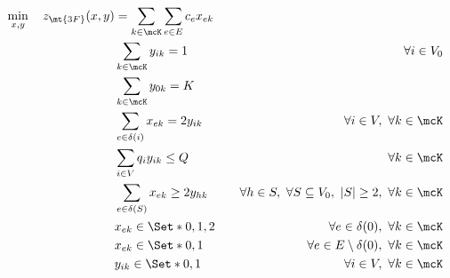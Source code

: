 \begin{align}
	\min_{x, y} \quad z_\mt{3F}(x, y) & = \sum_{k \in \mcK} \sum_{e \in E} c_{e} x_{ek} \label{eq:three-index-flow-obj-func}                                                                                                                           \\
	                                  & \sum_{k \in \mcK} y_{ik} = 1                                                         & \quad \forall i \in V_0                                              \label{eq:three-index-flow-all-customers-visited}  \\
	                                  & \sum_{k \in \mcK} y_{0k} = K                                                         & \label{eq:three-index-flow-tour-starts-and-ends-at-depot}                                                               \\
	                                  & \sum_{e \in \delta(i)} x_{ek} = 2 y_{ik}                                             & \quad \forall i \in V,\ \forall k \in \mcK \label{eq:three-index-flow-force-visited-customer-if-flow}                   \\
	                                  & \sum_{i \in V} q_i y_{ik} \le Q                                                      & \quad \forall k \in \mcK \label{eq:three-index-flow-force-resource-upper-bound}                                         \\
	                                  & \sum_{e \in \delta(S)} x_{ek} \ge 2 y_{hk}                                           & \quad \forall h \in S,\ \forall S \subseteq V_0,\ |S| \ge 2,\ \forall k \in \mcK \label{eq:three-index-flow-secv1}      \\
	                                  & x_{ek}                   \in \Set*{0, 1, 2}                                          & \quad \forall e \in \delta(0),\ \forall k \in \mcK             \label{eq:three-index-flow-x-mip-var-bounds-depot}       \\
	                                  & x_{ek}                   \in \Set*{0, 1}                                             & \quad \forall e \in E \setminus \delta(0),\ \forall k \in \mcK             \label{eq:three-index-flow-x-mip-var-bounds} \\
	                                  & y_{ik}                    \in \Set*{0, 1}                                            & \quad \forall i \in V,\ \forall k \in \mcK  \label{eq:three-index-flow-y-mip-var-bounds}
\end{align}

